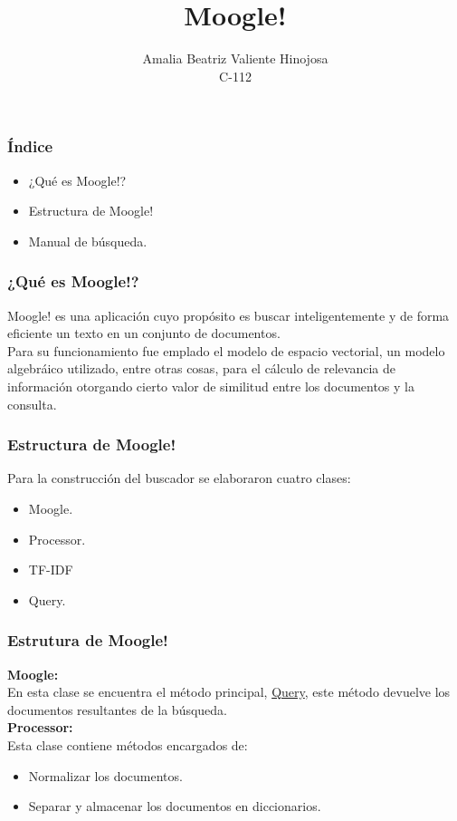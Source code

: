 \documentclass{beamer}
\title{Moogle!}
\author{Amalia Beatriz Valiente Hinojosa\\C-112}
\institute{ Facultad de Matem\'atica y Computaci\'on, Universidad de La Habana}
\date{}
\begin{document}
\begin{frame}
{\titlepage}
\end{frame}

\begin{frame}
    \frametitle{\'Indice}
    \begin{itemize}
        \item ¿Qu\'e es Moogle!?
        \item Estructura de Moogle!
        \item Manual de b\'usqueda.
    \end{itemize}

\end{frame}

\begin{frame}
    \frametitle{¿Qu\'e es Moogle!?}
    \Large Moogle! es una aplicaci\'on cuyo prop\'osito es buscar inteligentemente y de forma eficiente un texto en un conjunto de documentos.\\ Para su funcionamiento fue emplado el modelo de espacio vectorial, un modelo algebr\'aico utilizado, entre otras cosas, para el c\'alculo de relevancia de informaci\'on otorgando cierto valor de similitud entre los documentos y la consulta.
\end{frame}

\begin{frame}
    \frametitle{Estructura de Moogle!}
    \Large Para la construcci\'on del buscador se elaboraron cuatro clases:
    \begin{itemize}
        \item Moogle.
        \item Processor.
        \item TF-IDF
        \item Query.
    \end{itemize}
    
\end{frame}

\begin{frame}
\frametitle{Estrutura de Moogle!}
  \textbf{\Large Moogle:}\\
  \Large En esta clase se encuentra el m\'etodo principal, \underline{Query}, este m\'etodo devuelve los documentos resultantes de la b\'usqueda.\\
  \textbf{\Large Processor:}\\
  \Large Esta clase contiene m\'etodos encargados de:
  \begin{itemize}
    \item Normalizar los documentos.
    \item Separar y almacenar los documentos en diccionarios.
  \end{itemize}
\end{frame}
\end{document}
